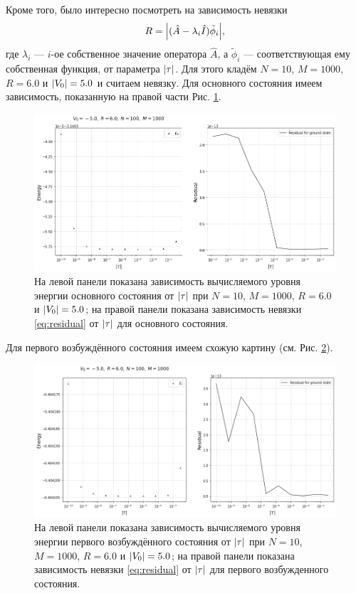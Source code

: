 \documentclass[10pt]{article}
\begin{document}
Кроме того, было интересно посмотреть на зависимость невязки
\begin{equation}
 R = \abs{(\hat A - \lambda_i \hat I) \tilde \phi_i},
 \label{eq:residual}
\end{equation}
где $\lambda_i$ --- $i$-ое собственное значение оператора $\hat A$, а $ \tilde \phi_i$ --- соответствующая ему собственная функция, от параметра $\abs{\tau}$. Для этого кладём $N=10$, $M=1000$, $R=6.0$ и $\abs{V_0}=5.0$ и считаем невязку. Для основного состояния имеем зависимость, показанную на правой части Рис. \ref{fig:E_vs_tau_-5.0_e0}.
\begin{figure}[htbp]
    \centering
    \includegraphics[width=\textwidth]{../figures/E_vs_tau_-5.0_e0}
    \caption{На левой панели показана зависимость вычисляемого уровня энергии основного состояния от $\abs{\tau}$ при  $N=10$, $M=1000$, $R=6.0$ и $\abs{V_0}=5.0$; на правой панели показана зависимость невязки \eqref{eq:residual} от $\abs{\tau}$ для основного состояния.}
    \label{fig:E_vs_tau_-5.0_e0}
\end{figure}
Для первого возбуждённого состояния имеем схожую картину (см. Рис. \ref{fig:E_vs_tau_-5.0_e1}).
\begin{figure}[htbp]
    \centering
    \includegraphics[width=\textwidth]{../figures/E_vs_tau_-5.0_e1}
    \caption{На левой панели показана зависимость вычисляемого уровня энергии первого возбуждённого состояния от $\abs{\tau}$ при  $N=10$, $M=1000$, $R=6.0$ и $\abs{V_0}=5.0$; на правой панели показана зависимость невязки \eqref{eq:residual} от $\abs{\tau}$ для первого возбужденного состояния.}
    \label{fig:E_vs_tau_-5.0_e1}
\end{figure}
\end{document}
